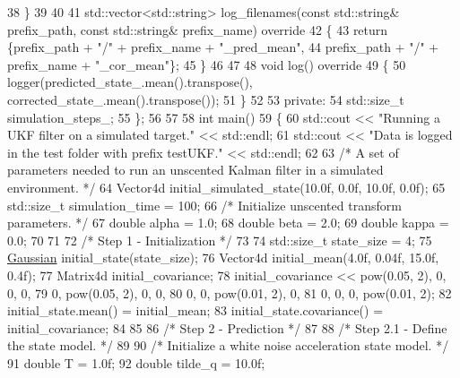 \begin{DoxyCodeInclude}
38     \}
39 
40 
41     std::vector<std::string> log\_filenames(\textcolor{keyword}{const} std::string& prefix\_path, \textcolor{keyword}{const} std::string& prefix\_name)\textcolor{keyword}{
       override}
42 \textcolor{keyword}{    }\{
43         \textcolor{keywordflow}{return} \{prefix\_path + \textcolor{stringliteral}{"/"} + prefix\_name + \textcolor{stringliteral}{"\_pred\_mean"},
44                 prefix\_path + \textcolor{stringliteral}{"/"} + prefix\_name + \textcolor{stringliteral}{"\_cor\_mean"}\};
45     \}
46 
47 
48     \textcolor{keywordtype}{void} log()\textcolor{keyword}{ override}
49 \textcolor{keyword}{    }\{
50         logger(predicted\_state\_.mean().transpose(), corrected\_state\_.mean().transpose());
51     \}
52 
53 \textcolor{keyword}{private}:
54     std::size\_t simulation\_steps\_;
55 \};
56 
57 
58 \textcolor{keywordtype}{int} main()
59 \{
60     std::cout << \textcolor{stringliteral}{"Running a UKF filter on a simulated target."} << std::endl;
61     std::cout << \textcolor{stringliteral}{"Data is logged in the test folder with prefix testUKF."} << std::endl;
62 
63     \textcolor{comment}{/* A set of parameters needed to run an unscented Kalman filter in a simulated environment. */}
64     Vector4d initial\_simulated\_state(10.0f, 0.0f, 10.0f, 0.0f);
65     std::size\_t simulation\_time = 100;
66     \textcolor{comment}{/* Initialize unscented transform parameters. */}
67     \textcolor{keywordtype}{double} alpha = 1.0;
68     \textcolor{keywordtype}{double} beta = 2.0;
69     \textcolor{keywordtype}{double} kappa = 0.0;
70 
71 
72     \textcolor{comment}{/* Step 1 - Initialization */}
73 
74     std::size\_t state\_size = 4;
75     \mbox{\hyperlink{classbfl_1_1Gaussian}{Gaussian}} initial\_state(state\_size);
76     Vector4d initial\_mean(4.0f, 0.04f, 15.0f, 0.4f);
77     Matrix4d initial\_covariance;
78     initial\_covariance << pow(0.05, 2), 0,            0,            0,
79                           0,            pow(0.05, 2), 0,            0,
80                           0,            0,            pow(0.01, 2), 0,
81                           0,            0,            0,            pow(0.01, 2);
82     initial\_state.mean() = initial\_mean;
83     initial\_state.covariance() = initial\_covariance;
84 
85 
86     \textcolor{comment}{/* Step 2 - Prediction */}
87 
88     \textcolor{comment}{/* Step 2.1 - Define the state model. */}
89 
90     \textcolor{comment}{/* Initialize a white noise acceleration state model. */}
91     \textcolor{keywordtype}{double} T = 1.0f;
92     \textcolor{keywordtype}{double} tilde\_q = 10.0f;

\end{DoxyCodeInclude}
